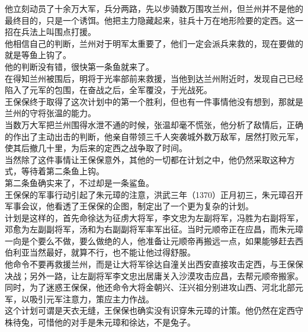 \begin{multicols}{\theparacolNo}
他立刻动员了十余万大军，兵分两路，先以步骑数万围攻兰州，但兰州并不是他的最终目的，只是一个诱饵。他把主力隐藏起来，驻兵十万在地形险要的定西。这一招在兵法上叫围点打援。\\

他相信自己的判断，兰州对于明军太重要了，他们一定会派兵来救的，现在要做的就是等鱼上钩了。\\

他的判断没有错，很快第一条鱼就来了。\\

在得知兰州被围后，明将于光率部前来救援，当他到达兰州附近时，发现自己已经陷入了元军的包围，在奋战之后，全军覆没，于光战死。\\

王保保终于取得了这次计划中的第一个胜利，但也有一件事情他没有想到，那就是兰州的守将张温的能力。\\

当数万大军把兰州围得水泄不通的时候，张温却毫不慌张，他分析了敌情后，正确的作出了主动出击的判断，他亲自带领三千人突袭城外数万敌军，居然打败元军，使其后撤几十里，为后来的定西之战争取了时间。\\

当然除了这件事情让王保保意外，其他的一切都在计划之中，他仍然采取这种方式，等待着第二条鱼上钩。\\

第二条鱼确实来了，不过却是一条鲨鱼。\\

王保保的军事行动引起了朱元璋的注意，洪武三年（1370）正月初三，朱元璋召开军事会议，他看透了王保保的企图，制定出了一个更为复杂的计划。\\

计划是这样的，首先命徐达为征虏大将军，李文忠为左副将军，冯胜为右副将军，邓愈为左副副将军，汤和为右副副将军率军出征。当时元顺帝正在应昌，而朱元璋一向是个要么不做，要么做绝的人，他准备让元顺帝再搬远一点，如果能够赶去西伯利亚当然最好，就算不行，也不能让他过得舒服。\\

他命令不要再救援兰州，而是让大将军徐达自潼关出西安直接攻击定西，与王保保决战；另外一路，让左副将军李文忠出居庸关入沙漠攻击应昌，去帮元顺帝搬家。\\

同时，为了迷惑王保保，他还命令大将金朝兴、汪兴祖分别进攻山西、河北北部元军，以吸引元军注意力，策应主力作战。\\

这个计划可谓是天衣无缝，王保保也确实没有识穿朱元璋的计策。他仍然在定西守株待兔，可惜他的对手是朱元璋和徐达，不是兔子。\\


\end{multicols}
